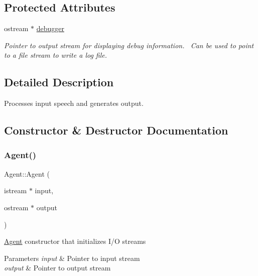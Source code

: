 \subsection*{Protected Attributes}
\begin{DoxyCompactItemize}
\item 
\mbox{\label{classAgent_a5536c1d6d3beb2d9ccee127d33ceaf2e}} 
ostream $\ast$ \mbox{\hyperlink{classAgent_a5536c1d6d3beb2d9ccee127d33ceaf2e}{debugger}}
\begin{DoxyCompactList}\small\item\em Pointer to output stream for displaying debug information.~\newline
Can be used to point to a file stream to write a log file. \end{DoxyCompactList}\end{DoxyCompactItemize}


\subsection{Detailed Description}
Processes input speech and generates output. 

\subsection{Constructor \& Destructor Documentation}
\mbox{\label{classAgent_a3db4a9cfcea636c9d63ec73729225fc8}} 
\subsubsection{\texorpdfstring{Agent()}{Agent()}}
{\footnotesize\ttfamily Agent\+::\+Agent (\begin{DoxyParamCaption}\item[{istream $\ast$}]{input,  }\item[{ostream $\ast$}]{output }\end{DoxyParamCaption})}

\mbox{\hyperlink{classAgent}{Agent}} constructor that initializes I/O streams 
\begin{DoxyParams}{Parameters}
{\em input} & Pointer to input stream \\
\hline
{\em output} & Pointer to output stream \\
\hline
\end{DoxyParams}


